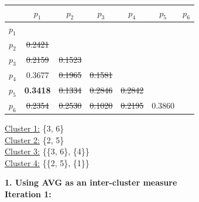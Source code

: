 \documentclass[11pt]{article}
\begin{document}
	\begin{center}
    	\begin{adjustbox}{max width=\textwidth}
		\begin{tabular}{ | c | c | c | c | c | c | c |}
	  	 	\hline

	  	 	& \textbf{$p_1$} & \textbf{$p_2$} & \textbf{$p_3$} & \textbf{$p_4$} & \textbf{$p_5$} & \textbf{$p_6$}\\
	  	 	\hline
	  	 	
	  	 	\textbf{$p_1$} &  &  &  &  &  &\\
	  	 	\hline
	  	 	
	  	 	\textbf{$p_2$} & \st{0.2421} &  &  &  &  &  \\
	  	 	\hline
	  	 	
	  	 	\textbf{$p_3$} & \st{0.2159} & \st{0.1523} &  &  &  & \\
	  	 	\hline
	  	 	
	  	 	\textbf{$p_4$} & 0.3677 & \st{0.1965} & \st{0.1581} &  &  & \\
	  	 	\hline
	  	 	
	  	 	\textbf{$p_5$} & \textbf{0.3418} & \st{0.1334} & \st{0.2846} & \st{0.2842} &  & \\
	  	 	\hline	
	  	 	
	  	 	\textbf{$p_6$} & \st{0.2354} & \st{0.2530} & \st{0.1020} & \st{0.2195} & 0.3860 & \\
	  	 	\hline			
    		\end{tabular}
    	\end{adjustbox}
	\end{center}
	
	\underline{Cluster 1:} \{3, 6\} \\
	\underline{Cluster 2:} \{2, 5\} \\
	\underline{Cluster 3:} \{\{3, 6\}, \{4\}\} \\
	\underline{Cluster 4:} \{\{2, 5\}, \{1\}\}
	\newpage
	
	
	\textbf{1. Using AVG as an inter-cluster measure} \\
	
	\textbf{Iteration 1:}
	
\end{document}
